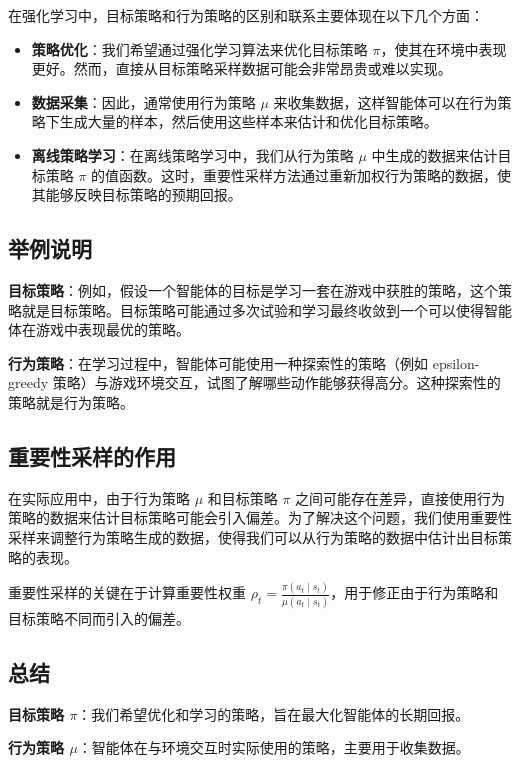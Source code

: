\documentclass[twocolumn, 10pt]{article} %
\theoremstyle{remark}
\begin{document}
在强化学习中，目标策略和行为策略的区别和联系主要体现在以下几个方面：

\begin{itemize}
    \item \textbf{策略优化}：我们希望通过强化学习算法来优化目标策略 \(\pi\)，使其在环境中表现更好。然而，直接从目标策略采样数据可能会非常昂贵或难以实现。
    \item \textbf{数据采集}：因此，通常使用行为策略 \(\mu\) 来收集数据，这样智能体可以在行为策略下生成大量的样本，然后使用这些样本来估计和优化目标策略。
    \item \textbf{离线策略学习}：在离线策略学习中，我们从行为策略 \(\mu\) 中生成的数据来估计目标策略 \(\pi\) 的值函数。这时，重要性采样方法通过重新加权行为策略的数据，使其能够反映目标策略的预期回报。
\end{itemize}

\subsection{举例说明}

\textbf{目标策略}：例如，假设一个智能体的目标是学习一套在游戏中获胜的策略，这个策略就是目标策略。目标策略可能通过多次试验和学习最终收敛到一个可以使得智能体在游戏中表现最优的策略。

\textbf{行为策略}：在学习过程中，智能体可能使用一种探索性的策略（例如 epsilon-greedy 策略）与游戏环境交互，试图了解哪些动作能够获得高分。这种探索性的策略就是行为策略。

\subsection{重要性采样的作用}

在实际应用中，由于行为策略 \(\mu\) 和目标策略 \(\pi\) 之间可能存在差异，直接使用行为策略的数据来估计目标策略可能会引入偏差。为了解决这个问题，我们使用重要性采样来调整行为策略生成的数据，使得我们可以从行为策略的数据中估计出目标策略的表现。

重要性采样的关键在于计算重要性权重 \(\rho_t = \frac{\pi(a_t \mid s_t)}{\mu(a_t \mid s_t)}\)，用于修正由于行为策略和目标策略不同而引入的偏差。

\subsection{总结}

\textbf{目标策略 \(\pi\)}：我们希望优化和学习的策略，旨在最大化智能体的长期回报。

\textbf{行为策略 \(\mu\)}：智能体在与环境交互时实际使用的策略，主要用于收集数据。
\end{document}

